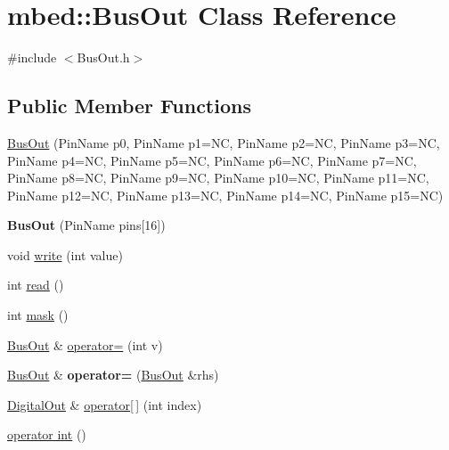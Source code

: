 \hypertarget{classmbed_1_1BusOut}{}\section{mbed\+:\+:Bus\+Out Class Reference}
\label{classmbed_1_1BusOut}


{\ttfamily \#include $<$Bus\+Out.\+h$>$}

\subsection*{Public Member Functions}
\begin{DoxyCompactItemize}
\item 
\hyperlink{classmbed_1_1BusOut_a05733cb6ed754af032de0be4d02c4604}{Bus\+Out} (Pin\+Name p0, Pin\+Name p1=NC, Pin\+Name p2=NC, Pin\+Name p3=NC, Pin\+Name p4=NC, Pin\+Name p5=NC, Pin\+Name p6=NC, Pin\+Name p7=NC, Pin\+Name p8=NC, Pin\+Name p9=NC, Pin\+Name p10=NC, Pin\+Name p11=NC, Pin\+Name p12=NC, Pin\+Name p13=NC, Pin\+Name p14=NC, Pin\+Name p15=NC)
\item 
{\bfseries Bus\+Out} (Pin\+Name pins\mbox{[}16\mbox{]})\hypertarget{classmbed_1_1BusOut_adf835a7d7d6f901a96b2d07c9ba495d8}{}\label{classmbed_1_1BusOut_adf835a7d7d6f901a96b2d07c9ba495d8}

\item 
void \hyperlink{classmbed_1_1BusOut_a907cb408dae3f4808ed5d580da4dcae9}{write} (int value)
\item 
int \hyperlink{classmbed_1_1BusOut_afd5c1c6fe1697c32f8976bec51d6c7e7}{read} ()
\item 
int \hyperlink{classmbed_1_1BusOut_a59a7cd605bd6d2b3eb717497c62d061a}{mask} ()
\item 
\hyperlink{classmbed_1_1BusOut}{Bus\+Out} \& \hyperlink{classmbed_1_1BusOut_a041460a5044d63235efbe517a3e20d28}{operator=} (int v)
\item 
\hyperlink{classmbed_1_1BusOut}{Bus\+Out} \& {\bfseries operator=} (\hyperlink{classmbed_1_1BusOut}{Bus\+Out} \&rhs)\hypertarget{classmbed_1_1BusOut_a35fd8464ad606bf950564b179090a4d5}{}\label{classmbed_1_1BusOut_a35fd8464ad606bf950564b179090a4d5}

\item 
\hyperlink{classmbed_1_1DigitalOut}{Digital\+Out} \& \hyperlink{classmbed_1_1BusOut_afbe6d93bfa9c657129acb49ad0691bf4}{operator\mbox{[}$\,$\mbox{]}} (int index)
\item 
\hyperlink{classmbed_1_1BusOut_aea2726eb3c2774945f4e79114839fe75}{operator int} ()
\end{DoxyCompactItemize}

